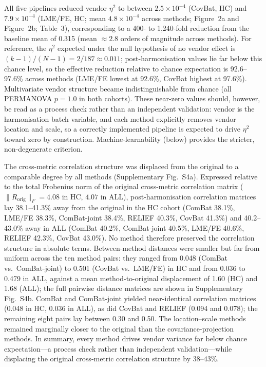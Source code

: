 \documentclass[12pt,a4paper]{article}
\begin{document}
All five pipelines reduced vendor $\eta^2$ to between $2.5\times10^{-4}$ (CovBat, HC) and $7.9\times10^{-4}$ (LME/FE, HC; mean $4.8\times10^{-4}$ across methods; Figure~2a and Figure~2b; Table~3), corresponding to a 400- to 1,240-fold reduction from the baseline mean of 0.315 (mean $\approx2.8$ orders of magnitude across methods). For reference, the $\eta^2$ expected under the null hypothesis of no vendor effect is $(k-1)/(N-1)=2/187\approx0.011$; post-harmonisation values lie far below this chance level, so the effective reduction relative to chance expectation is 92.6--97.6\% across methods (LME/FE lowest at 92.6\%, CovBat highest at 97.6\%). Multivariate vendor structure became indistinguishable from chance (all PERMANOVA $p=1.0$ in both cohorts). These near-zero values should, however, be read as a process check rather than an independent validation: vendor is the harmonisation batch variable, and each method explicitly removes vendor location and scale, so a correctly implemented pipeline is expected to drive $\eta^2$ toward zero by construction. Machine-learnability (below) provides the stricter, non-degenerate criterion.

The cross-metric correlation structure was displaced from the original to a comparable degree by all methods (Supplementary Fig.~S4a). Expressed relative to the total Frobenius norm of the original cross-metric correlation matrix ($\|R_{\mathrm{orig}}\|_F=4.08$ in HC, $4.07$ in ALL), post-harmonisation correlation matrices lay 38.1--41.3\% away from the original in the HC cohort (ComBat 38.1\%, LME/FE 38.3\%, ComBat-joint 38.4\%, RELIEF 40.3\%, CovBat 41.3\%) and 40.2--43.0\% away in ALL (ComBat 40.2\%, ComBat-joint 40.5\%, LME/FE 40.6\%, RELIEF 42.3\%, CovBat 43.0\%). No method therefore preserved the correlation structure in absolute terms. Between-method distances were smaller but far from uniform across the ten method pairs: they ranged from 0.048 (ComBat vs.\ ComBat-joint) to 0.501 (CovBat vs.\ LME/FE) in HC and from 0.036 to 0.479 in ALL, against a mean method-to-original displacement of 1.60 (HC) and 1.68 (ALL); the full pairwise distance matrices are shown in Supplementary Fig.~S4b. ComBat and ComBat-joint yielded near-identical correlation matrices (0.048 in HC, 0.036 in ALL), as did CovBat and RELIEF (0.094 and 0.078); the remaining eight pairs lay between 0.30 and 0.50. The location--scale methods remained marginally closer to the original than the covariance-projection methods. In summary, every method drives vendor variance far below chance expectation---a process check rather than independent validation---while displacing the original cross-metric correlation structure by 38--43\%.
\end{document}
